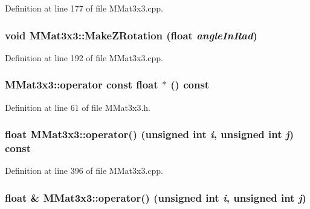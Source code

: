 Definition at line 177 of file MMat3x3.cpp.\hypertarget{class_m_mat3x3_34c3fe8d743433b98bd1cdf0eb053224}{
\subsubsection[{MakeZRotation}]{\setlength{\rightskip}{0pt plus 5cm}void MMat3x3::MakeZRotation (float {\em angleInRad})}}
\label{class_m_mat3x3_34c3fe8d743433b98bd1cdf0eb053224}




Definition at line 192 of file MMat3x3.cpp.\hypertarget{class_m_mat3x3_95b4cd80d8d663a4210f8645ee91bc7b}{
\subsubsection[{operator const float $\ast$}]{\setlength{\rightskip}{0pt plus 5cm}MMat3x3::operator const float $\ast$ () const}}
\label{class_m_mat3x3_95b4cd80d8d663a4210f8645ee91bc7b}




Definition at line 61 of file MMat3x3.h.\hypertarget{class_m_mat3x3_41deda72139584e5d8f2d6191387f0aa}{
\subsubsection[{operator()}]{\setlength{\rightskip}{0pt plus 5cm}float MMat3x3::operator() (unsigned int {\em i}, \/  unsigned int {\em j}) const}}
\label{class_m_mat3x3_41deda72139584e5d8f2d6191387f0aa}




Definition at line 396 of file MMat3x3.cpp.\hypertarget{class_m_mat3x3_31c4291012e2002e0840a9d744c29f83}{
\subsubsection[{operator()}]{\setlength{\rightskip}{0pt plus 5cm}float \& MMat3x3::operator() (unsigned int {\em i}, \/  unsigned int {\em j})}}
\label{class_m_mat3x3_31c4291012e2002e0840a9d744c29f83}




